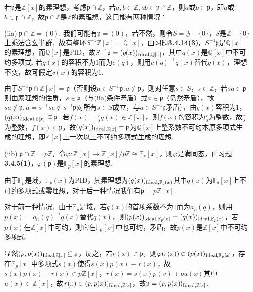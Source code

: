 若$\mathfrak{p}$是$\mathbb{Z}[x]$的素理想，考虑$\mathfrak{p}\cap\mathbb{Z}$，若$a,b\in\mathbb{Z}, ab\in\mathfrak{p}\cap\mathbb{Z}$，则$a$或$b\in\mathfrak{p}$，即$a$或$b\in\mathfrak{p}\cap\mathbb{Z}$，故$\mathfrak{p}\cap\mathbb{Z}$是$\mathbb{Z}$的素理想，这只能有两种情况：

(iia) $\mathfrak{p}\cap\mathbb{Z}=(0)$. 我们可能有$\mathfrak{p}=(0)$，若不然，则令$S=\mathfrak{Z}-\{0\}$，$S$是$\mathbb{Z}-\{0\}$上乘法含幺半群，故有整环$S^{-1}\mathbb{Z}[x]=\mathbb{Q}[x]$，由{\heiti 习题}\textbf{3.4.14(3)}，$S^{-1}\mathfrak{p}$是$\mathbb{Q}[x]$的素理想，而$\mathbb{Q}[x]$是PID，故$S^{-1}\mathfrak{p}=(q(x))_{\operatorname{Ideal}, \mathbb{Q}[x]}$，其中$q(x)$是$\mathbb{Q}[x]$中不可约多项式. 若$q(x)$的容积不为$1$而为$c(q)$，则用$c(q)^{-1}q(x)$替代$q(x)$，理想不变，故可假定$q(x)$的容积为$1$.

由于$S^{-1}\mathfrak{p}\cap\mathbb{Z}[x]=\mathfrak{p}$（否则设$a\in S^{-1}\mathfrak{p}, a\notin\mathfrak{p}$，则对任意$s\in S$，$s\in\mathbb{Z}$，若$sa\in\mathfrak{p}$则由素理想的性质，$s\in\mathfrak{p}$（与(iia)条件矛盾）或$a\in\mathfrak{p}$（仍然矛盾），故$sa\notin\mathfrak{p}, a=s^{-1}sa\notin s^{-1}\mathfrak{p}$对所有$s\in S$成立，与$a\in S^{-1}\mathfrak{p}$矛盾），由$q(x)$容积为$1$，$(q(x))_{\operatorname{Ideal}, \mathbb{Z}[x]}\subseteq\mathfrak{p}$. 若$f(x)=\frac{r}{s}q(x)\in\mathbb{Z}[x]$，则$f(x)$的容积为$\frac{r}{s}$为整数，故$\frac{r}{s}$为整数，$f(x)\in\mathfrak{p}$，故$(q(x))_{\operatorname{Ideal}, \mathbb{Z}[x]}=\mathfrak{p}$为$\mathbb{Q}[x]$上整系数不可约本原多项式生成的理想，即$\mathbb{Z}[x]$上一次以上不可约多项式生成的理想.

(iib) $\mathfrak{p}\cap\mathbb{Z}=p\mathbb{Z}$，令$\varphi: \mathbb{Z}[x]\rightarrow \mathbb{Z}[x]/p\mathbb{Z}\cong\mathbb{F}_p[x]$，则$\varphi$是满同态，由{\heiti 习题}\textbf{3.4.5(1)}，$\varphi(\mathfrak{p})$是$\mathbb{F}_p[x]$的素理想.

由于$\mathbb{F}_p$是域，$\mathbb{F}_p(x)$为PID，其素理想为$(q(x))_{\operatorname{Ideal}, \mathbb{F}_p(x)}$其中$q(x)$为$\mathbb{F}_p[x]$上不可约多项式或零理想，对于后一种情况我们有$\mathfrak{p}=p\mathbb{Z}[x]$.

对于前一种情况，由于$\mathbb{F}_p$是域，若$q(x)$的首项系数不为$1$而为$a_n(q)$，则用$p(x)=a_n(q)^{-1}q(x)$替代$q(x)$，则$(p(x))_{\operatorname{Ideal}, \mathbb{F}_p(x)}=(q(x))_{\operatorname{Ideal}, \mathbb{F}_p(x)}$，若$p(x)$在$\mathbb{Z}[x]$中可约，则它在$\mathbb{F}_p[x]$中也可约，矛盾，故$p(x)$是$\mathbb{Z}[x]$中不可约多项式.

显然$(p, p(x))_{\operatorname{Ideal}, \mathbb{Z}[x]}\subseteq\mathfrak{p}$，反之，若$r(x)\in\mathfrak{p}$，则$\varphi(r(x))\in(p(x))_{\operatorname{Ideal}, \mathbb{F}_p[x]}$，存在$\mathbb{F}_p[x]$中多项式$s(x)$使得$s(x)p(x)\equiv r(x)$，故$s(x)p(x)-r(x)\in p\mathbb{Z}[x]$，$r(x)=s(x)p(x)+pu(x)$其中$u(x)\in\mathbb{Z}[x]$，故$r(x)\in(p,p(x))_{\operatorname{Ideal}, \mathbb{Z}[x]}$，故$\mathfrak{p}=(p,p(x))_{\operatorname{Ideal}, \mathbb{Z}[x]}$.


